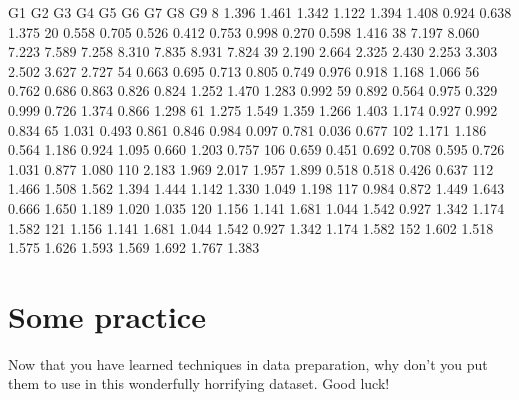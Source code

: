 \documentclass[letterpaper,10pt,english]{jupyterBook}
\begin{document}
\begin{sphinxVerbatim}[commandchars=\\\{\}]
        G1     G2     G3     G4     G5     G6     G7     G8     G9
8    1.396  1.461  1.342  1.122  1.394  1.408  0.924  0.638  1.375
20  \PYGZhy{}0.558 \PYGZhy{}0.705 \PYGZhy{}0.526 \PYGZhy{}0.412 \PYGZhy{}0.753 \PYGZhy{}0.998 \PYGZhy{}0.270  0.598 \PYGZhy{}1.416
38   7.197  8.060  7.223  7.589  7.258  8.310  7.835  8.931  7.824
39   2.190  2.664  2.325  2.430  2.253  3.303  2.502  3.627  2.727
54  \PYGZhy{}0.663 \PYGZhy{}0.695 \PYGZhy{}0.713 \PYGZhy{}0.805 \PYGZhy{}0.749 \PYGZhy{}0.976 \PYGZhy{}0.918 \PYGZhy{}1.168 \PYGZhy{}1.066
56  \PYGZhy{}0.762 \PYGZhy{}0.686 \PYGZhy{}0.863 \PYGZhy{}0.826 \PYGZhy{}0.824 \PYGZhy{}1.252 \PYGZhy{}1.470 \PYGZhy{}1.283 \PYGZhy{}0.992
59  \PYGZhy{}0.892 \PYGZhy{}0.564 \PYGZhy{}0.975 \PYGZhy{}0.329 \PYGZhy{}0.999 \PYGZhy{}0.726 \PYGZhy{}1.374 \PYGZhy{}0.866 \PYGZhy{}1.298
61   1.275  1.549  1.359  1.266  1.403  1.174  0.927  0.992  0.834
65  \PYGZhy{}1.031 \PYGZhy{}0.493 \PYGZhy{}0.861 \PYGZhy{}0.846 \PYGZhy{}0.984 \PYGZhy{}0.097 \PYGZhy{}0.781  0.036 \PYGZhy{}0.677
102 \PYGZhy{}1.171 \PYGZhy{}1.186 \PYGZhy{}0.564 \PYGZhy{}1.186 \PYGZhy{}0.924 \PYGZhy{}1.095 \PYGZhy{}0.660 \PYGZhy{}1.203 \PYGZhy{}0.757
106 \PYGZhy{}0.659 \PYGZhy{}0.451 \PYGZhy{}0.692 \PYGZhy{}0.708 \PYGZhy{}0.595 \PYGZhy{}0.726 \PYGZhy{}1.031 \PYGZhy{}0.877 \PYGZhy{}1.080
110  2.183  1.969  2.017  1.957  1.899  0.518  0.518  0.426  0.637
112  1.466  1.508  1.562  1.394  1.444  1.142  1.330  1.049  1.198
117  0.984  0.872  1.449  1.643  0.666  1.650  1.189  1.020  1.035
120  1.156  1.141  1.681  1.044  1.542  0.927  1.342  1.174  1.582
121  1.156  1.141  1.681  1.044  1.542  0.927  1.342  1.174  1.582
152  1.602  1.518  1.575  1.626  1.593  1.569  1.692  1.767  1.383
\end{sphinxVerbatim}


\chapter{Some practice}
\label{\detokenize{c2_data_preparation/some_practice:some-practice}}\label{\detokenize{c2_data_preparation/some_practice::doc}}
\sphinxAtStartPar
Now that you have learned techniques in data preparation, why don’t you put them to use in this wonderfully horrifying dataset. Good luck!

\begin{sphinxVerbatim}[commandchars=\\\{\}]
 
 

   
\end{sphinxVerbatim}
\end{document}
